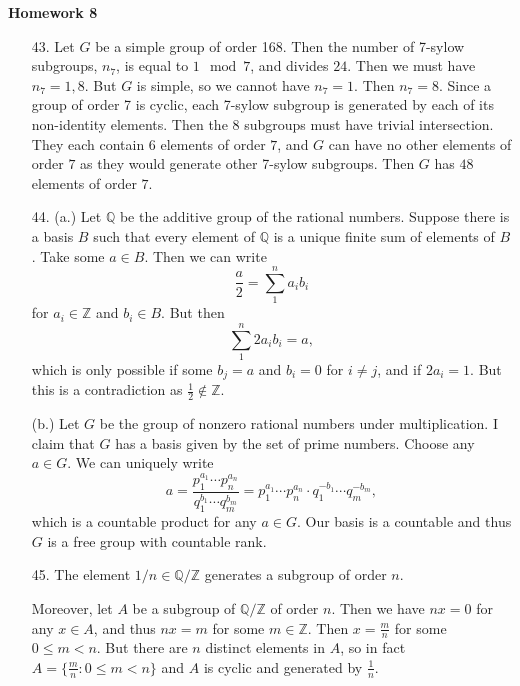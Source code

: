 \documentclass[11pt, reqno]{article}
\theoremstyle{plain}
\theoremstyle{definition}
\theoremstyle{remark}
\newcommand{\ZZ}{\mathbb{Z}}
\newcommand{\QQ}{\mathbb{Q}}
\begin{document}
\topmargin=-40pt
\renewcommand{\headrulewidth}{1pt}
\renewcommand{\headsep}{20pt}
\thispagestyle{fancy}

{\Huge \bfseries \noindent Homework 8}

\begin{enumerate}
    \item[43.] Let $G$ be a simple group of order 168. Then the number of 7-sylow subgroups, $n_7$,
    is equal to $1 \mod 7$, and divides $24$. Then we must have $n_7 = 1, 8$. But $G$ is simple,
    so we cannot have $n_7 = 1$. Then $n_7 = 8$. Since a group of order 7 is cyclic, each 7-sylow
    subgroup is generated by each of its non-identity elements. Then the 8 subgroups must have trivial
    intersection. They each contain $6$ elements of order $7$, and $G$ can have no other 
    elements of order $7$ as they would generate other 7-sylow subgroups. Then $G$ has 
    $48$ elements of order $7$.

    \item[44.] (a.) Let $\QQ$ be the additive group of the rational numbers. Suppose there is 
    a basis $B$ such that every element of $\QQ$ is a unique finite sum of elements of $B$. Take
    some $a \in B$. Then we can write
    \[
        \frac{a}{2} = \sum_1^n a_i b_i
    \]
    for $a_i \in \ZZ$ and $b_i \in B$. But then 
    \[
        \sum_1^n 2a_i b_i = a,
    \]
    which is only possible if some $b_j = a$ and $b_i = 0$ for $i \neq j$, and if $2a_i = 1$. But
    this is a contradiction as $\frac{1}{2} \notin \ZZ$. 

    (b.) Let $G$ be the group of nonzero rational numbers under multiplication. I claim that $G$
    has a basis given by the set of prime numbers. Choose any $a \in G$. We can uniquely write
    \[
        a = \frac{p_1^{a_1}\cdots p_n^{a_n}}{q_1^{b_1}\cdots q_m^{b_m}} = 
        p_1^{a_1}\cdots p_n^{a_n}\cdot q_1^{-b_1}\cdots q_m^{-b_m},
    \]
    which is a countable product for any $a \in G$. Our basis is a countable and thus $G$ is a free group 
    with countable rank. 

    \item[45.] The element $1/n \in \QQ/\ZZ$ generates a subgroup of order $n$. 
    
    Moreover, let $A$ be a subgroup of $\QQ/\ZZ$ of order $n$. Then we have $nx = 0$ for any $x \in A$,
    and thus $nx = m$ for some $m \in \ZZ$. Then $x = \frac{m}{n}$ for some $0 \leq m < n$. But there are 
    $n$ distinct elements in $A$, so in fact $A = \{\frac{m}{n}: 0 \leq m < n\}$ and $A$ is cyclic and 
    generated by $\frac{1}{n}$.


\end{enumerate}
\end{document}
